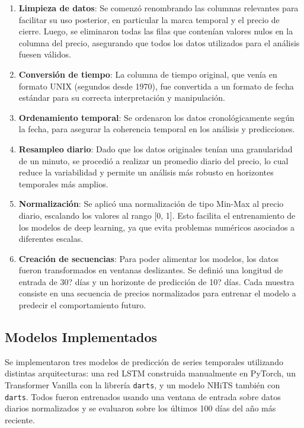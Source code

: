 \documentclass[12pt]{article}
\begin{document}
\begin{enumerate}
\item \textbf{Limpieza de datos}: Se comenzó renombrando las columnas relevantes para facilitar su uso posterior,
en particular la marca temporal y el precio de cierre. Luego, se eliminaron todas las filas que contenían valores
nulos en la columna del precio, asegurando que todos los datos utilizados para el análisis fuesen válidos.

\item \textbf{Conversión de tiempo}: La columna de tiempo original, que venía en formato UNIX (segundos desde 1970),
fue convertida a un formato de fecha estándar para su correcta interpretación y manipulación.

\item \textbf{Ordenamiento temporal}: Se ordenaron los datos cronológicamente según la fecha, para asegurar
la coherencia temporal en los análisis y predicciones.

\item \textbf{Resampleo diario}: Dado que los datos originales tenían una granularidad de un minuto,
se procedió a realizar un promedio diario del precio, lo cual reduce la variabilidad y permite un análisis más
robusto en horizontes temporales más amplios.

\item \textbf{Normalización}: Se aplicó una normalización de tipo Min-Max al precio diario, escalando los valores
al rango [0, 1].
Esto facilita el entrenamiento de los modelos de deep learning, ya que evita problemas numéricos asociados a
diferentes escalas.

\item \textbf{Creación de secuencias}: Para poder alimentar los modelos, los datos fueron transformados en ventanas deslizantes.
Se definió una longitud de entrada de 30? días y un horizonte de predicción de 10? días. %
Cada muestra consiste en una secuencia de precios normalizados para entrenar el modelo a predecir el comportamiento futuro.
\end{enumerate}


\newpage
\subsection{Modelos Implementados}

Se implementaron tres modelos de predicción de series temporales utilizando distintas arquitecturas: una red LSTM construida manualmente en PyTorch,
un Transformer Vanilla con la librería \texttt{darts}, y un modelo NHiTS también con \texttt{darts}.
Todos fueron entrenados usando una ventana de entrada sobre datos diarios normalizados y se evaluaron sobre los últimos 100 días del año más reciente.
\end{document}
